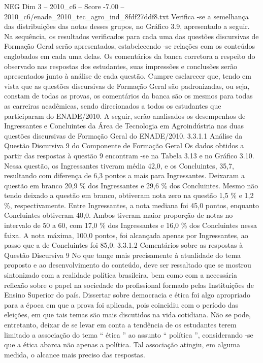 \begin{textsample}{NEG Dim 3 – 2010\_c6 – Score -7.00 – 2010\_c6/enade\_2010\_tec\_agro\_ind\_8fdf27ddf8.txt}
Verifica -se a semelhança das distribuições das notas desses grupos, no Gráfico 3.9, apresentado a seguir.
Na sequência, os resultados verificados para cada uma das questões discursivas de Formação Geral serão apresentados, estabelecendo -se relações com os conteúdos englobados em cada uma delas.
Os comentários da banca corretora a respeito do observado nas respostas dos estudantes, suas impressões e conclusões serão apresentados junto à análise de cada questão.
Cumpre esclarecer que, tendo em vista que as questões discursivas de Formação Geral são padronizadas, ou seja, constam de todas as provas, os comentários da banca são os mesmos para todas as carreiras acadêmicas, sendo direcionados a todos os estudantes que participaram do ENADE/2010.
A seguir, serão analisados os desempenhos de Ingressantes e Concluintes da Área de Tecnologia em Agroindústria nas duas questões discursivas de Formação Geral do ENADE/2010. 3.3.1.1 Análise da Questão Discursiva 9 do Componente de Formação Geral Os dados obtidos a partir das respostas à questão 9 encontram -se na Tabela 3.13 e no Gráfico 3.10.
Nessa questão, os Ingressantes tiveram média 42,0, e os Concluintes, 35,7, resultando com diferença de 6,3 pontos a mais para Ingressantes.
Deixaram a questão em branco 20,9 \% dos Ingressantes e 29,6 \% dos Concluintes.
Mesmo não tendo deixado a questão em branco, obtiveram nota zero na questão 1,5 \% e 1,2 \%, respectivamente.
Entre Ingressantes, a nota mediana foi 45,0 pontos, enquanto Concluintes obtiveram 40,0.
Ambos tiveram maior proporção de notas no intervalo de 50 a 60, com 17,0 \% dos Ingressantes e 16,0 \% dos Concluintes nessa faixa.
A nota máxima, 100,0 pontos, foi alcançada apenas por Ingressantes, ao passo que a de Concluintes foi 85,0. 3.3.1.2 Comentários sobre as respostas à Questão Discursiva 9 No que tange mais precisamente à atualidade do tema proposto e ao desenvolvimento do conteúdo, deve ser ressaltado que se mostrou sintonizado com a realidade política brasileira, bem como com a necessária reflexão sobre o papel na sociedade do profissional formado pelas Instituições de Ensino Superior do país.
Dissertar sobre democracia e ética foi algo apropriado para a época em que a prova foi aplicada, pois coincidiu com o período das eleições, em que tais temas são mais discutidos na vida cotidiana.
Não se pode, entretanto, deixar de se levar em conta a tendência de os estudantes terem limitado a associação do tema “ ética ” ao assunto “ política ”, considerando -se que a ética abarca não apenas a política.
Tal associação atingiu, em alguma medida, o alcance mais preciso das respostas.

\end{textsample}
